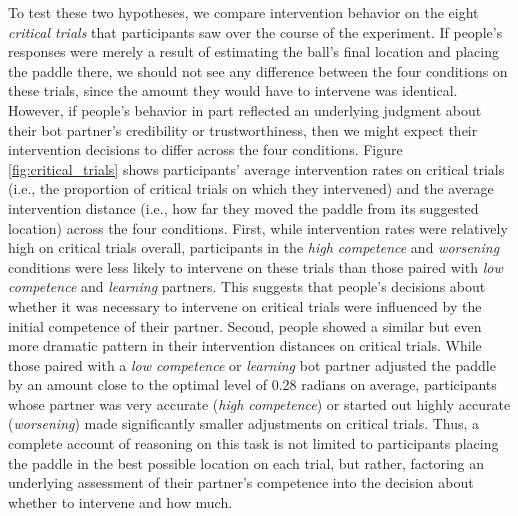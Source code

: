 \documentclass[10pt,letterpaper]{article}
\begin{document}
To test these two hypotheses, we compare intervention behavior on the eight \textit{critical trials} that participants saw over the course of the experiment. If people's responses were merely a result of estimating the ball's final location and placing the paddle there, we should not see any difference between the four conditions on these trials, since the amount they would have to intervene was identical. However, if people's behavior in part reflected an underlying judgment about their bot partner's credibility or trustworthiness, then we might expect their intervention decisions to differ across the four conditions. Figure \ref{fig:critical_trials} shows participants' average intervention rates on critical trials (i.e., the proportion of critical trials on which they intervened) and the average intervention distance (i.e., how far they moved the paddle from its suggested location) across the four conditions. First, while intervention rates were relatively high on critical trials overall, participants in the \textit{high competence} and \textit{worsening} conditions were less likely to intervene on these trials than those paired with \textit{low competence} and \textit{learning} partners. This suggests that people's decisions about whether it was necessary to intervene on critical trials were influenced by the initial competence of their partner. Second, people showed a similar but even more dramatic pattern in their intervention distances on critical trials. While those paired with a \textit{low competence} or \textit{learning} bot partner adjusted the paddle by an amount close to the optimal level of 0.28 radians on average, participants whose partner was very accurate (\textit{high competence}) or started out highly accurate (\textit{worsening}) made significantly smaller adjustments on critical trials. Thus, a complete account of  reasoning on this task is not limited to participants placing the paddle in the best possible location on each trial, but rather, factoring an underlying assessment of their partner's competence into the decision about whether to intervene and how much.
\end{document}
